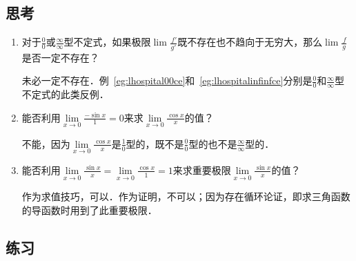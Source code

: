 \subsection*{思考}

\begin{enumerate}
\item 对于\(\frac00\)或\(\frac\infty\infty\)型不定式，如果极限\(\lim\frac{\,f'}{g'}\)既不存在也不趋向于无穷大，那么\(\lim\frac{\,f}{g}\)是否一定不存在？

  \ifshowsolp
  未必一定不存在．例~\ref{eg:lhospital00ce}和~\ref{eg:lhospitalinfinfce}分别是\(\frac00\)和\(\frac\infty\infty\)型不定式的此类反例．
  \fi

\item 能否利用\(\lim\limits_{x\to0} \frac{-\sin x}{1} = 0\)来求\(\lim\limits_{x\to0} \frac{\cos x}{x}\)的值？

  \ifshowsolp
  不能，因为\(\lim\limits_{x\to0} \frac{\cos x}{x}\)是\(\frac10\)型的，既不是\(\frac00\)型的也不是\(\frac\infty\infty\)型的．
  \fi

\item 能否利用\(\lim\limits_{x\to0} \frac{\sin x}{x} = \lim\limits_{x\to0} \frac{\cos x}{1} = 1\)来求重要极限\(\lim\limits_{x\to0} \frac{\sin x}{x}\)的值？

  \ifshowsolp
  作为求值技巧，可以．作为证明，不可以；因为存在循环论证，即求三角函数的导函数时用到了此重要极限．
  \fi
\end{enumerate}

\ifshowex
{}
\subsection*{练习}

